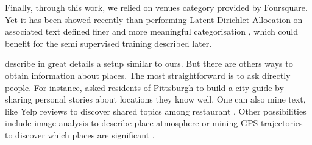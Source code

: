 Finally, through this work, we relied on venues category provided by
Foursquare. Yet it has been showed recently than performing Latent Dirichlet
Allocation on associated text defined finer and more meaningful categorisation
\autocite{PlaceSemantic14}, which could benefit for the semi supervised
training described later.

\bigskip

\Textcite{TwitterMongoDB13} describe in great details a setup similar to ours.
But there are others ways to obtain information about places. The most
straightforward is to ask directly people. For instance, \textcite{Curated14}
asked residents of Pittsburgh to build a city guide by sharing personal stories
about locations they know well. One can also mine text, like Yelp reviews to
discover shared topics among restaurant \autocite{YelpReview14}.  Other
possibilities include image analysis to describe place atmosphere or mining GPS
trajectories to discover which places are significant \autocite{GPSStay10}.
